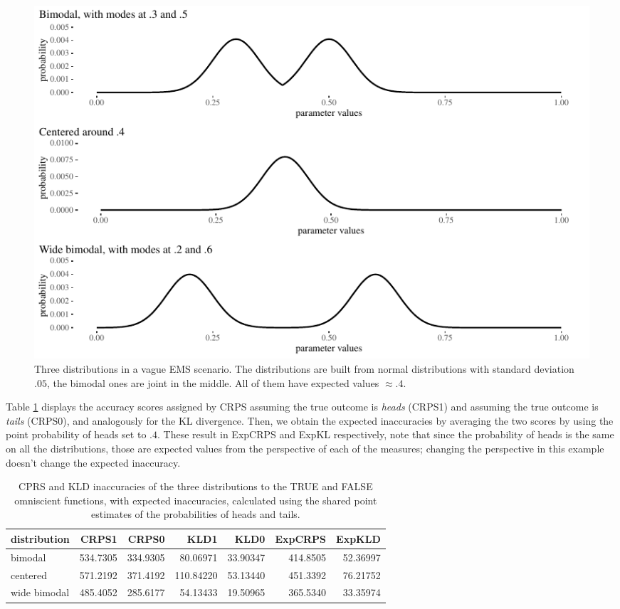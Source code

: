 \documentclass[
  letterpaper,
  DIV=11,
  numbers=noendperiod]{scrartcl}
\begin{document}
\begin{figure}[H]

{\centering \includegraphics[width=1\textwidth,height=\textheight]{imp_philosophical_files/figure-pdf/fig-emc-1.pdf}

}

\caption{\label{fig-emc}Three distributions in a vague EMS scenario. The
distributions are built from normal distributions with standard
deviation \(.05\), the bimodal ones are joint in the middle. All of them
have expected values \(\approx .4\).}

\end{figure}

\noindent  Table \ref{tbl:comp1} displays the accuracy scores assigned
by CRPS assuming the true outcome is \emph{heads} (CRPS1) and assuming
the true outcome is \emph{tails} (CRPS0), and analogously for the KL
divergence. Then, we obtain the expected inaccuracies by averaging the
two scores by using the point probability of heads set to \(.4\). These
result in ExpCRPS and ExpKL respectively, note that since the
probability of heads is the same on all the distributions, those are
expected values from the perspective of each of the measures; changing
the perspective in this example doesn't change the expected inaccuracy.

\begin{table}[H]
\centering
\begin{tabular}{lrrrrrr}
\toprule
distribution & CRPS1 & CRPS0 & KLD1 & KLD0 & ExpCRPS & ExpKLD\\
\midrule
bimodal & 534.7305 & 334.9305 & 80.06971 & 33.90347 & 414.8505 & 52.36997\\
centered & 571.2192 & 371.4192 & 110.84220 & 53.13440 & 451.3392 & 76.21752\\
wide bimodal & 485.4052 & 285.6177 & 54.13433 & 19.50965 & 365.5340 & 33.35974\\
\bottomrule
\end{tabular}
\caption{CPRS and KLD inaccuracies of the three distributions to the TRUE and FALSE omniscient functions, with expected inaccuracies, calculated using the shared point estimates of the probabilities of heads and tails.}
\label{tbl:comp1}
\end{table}
\end{document}
